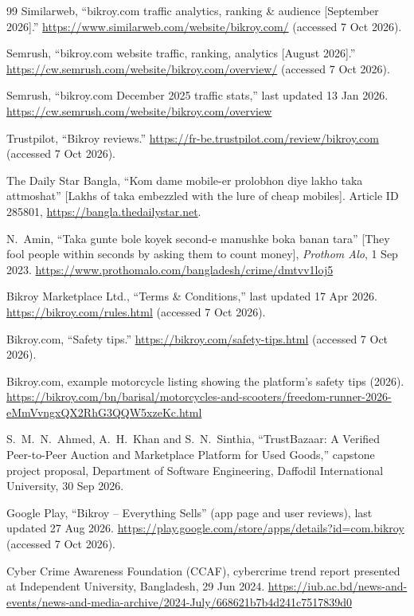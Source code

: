 \documentclass[11pt,a4paper]{article}
\begin{document}
\begin{thebibliography}{99}
 Similarweb, ``bikroy.com traffic analytics, ranking \& audience
[September 2026].'' \url{https://www.similarweb.com/website/bikroy.com/} (accessed 7 Oct 2026).

 Semrush, ``bikroy.com website traffic, ranking, analytics
[August 2026].'' \url{https://cw.semrush.com/website/bikroy.com/overview/} (accessed 7 Oct 2026).

 Semrush, ``bikroy.com December 2025 traffic stats,'' last updated
13 Jan 2026. \url{https://cw.semrush.com/website/bikroy.com/overview}

 Trustpilot, ``Bikroy reviews.''
\url{https://fr-be.trustpilot.com/review/bikroy.com} (accessed 7 Oct 2026).

 The Daily Star Bangla, ``Kom dame mobile-er prolobhon diye lakho
taka attmoshat'' [Lakhs of taka embezzled with the lure of cheap mobiles]. Article ID 285801,
\url{https://bangla.thedailystar.net}.

 N.~Amin, ``Taka gunte bole koyek second-e manushke boka banan tara''
[They fool people within seconds by asking them to count money], \emph{Prothom Alo},
1 Sep 2023. \url{https://www.prothomalo.com/bangladesh/crime/dmtvv1loj5}

 Bikroy Marketplace Ltd., ``Terms \& Conditions,'' last updated
17 Apr 2026. \url{https://bikroy.com/rules.html} (accessed 7 Oct 2026).

 Bikroy.com, ``Safety tips.''
\url{https://bikroy.com/safety-tips.html} (accessed 7 Oct 2026).

 Bikroy.com, example motorcycle listing showing the platform's
safety tips (2026).
\url{https://bikroy.com/bn/barisal/motorcycles-and-scooters/freedom-runner-2026-eMmVvngxQX2RhG3QQW5xzeKc.html}

 S.~M.~N.~Ahmed, A.~H.~Khan and S.~N.~Sinthia, ``TrustBazaar: A Verified
Peer-to-Peer Auction and Marketplace Platform for Used Goods,'' capstone project proposal,
Department of Software Engineering, Daffodil International University, 30 Sep 2026.

 Google Play, ``Bikroy -- Everything Sells'' (app page and user
reviews), last updated 27 Aug 2026.
\url{https://play.google.com/store/apps/details?id=com.bikroy} (accessed 7 Oct 2026).

 Cyber Crime Awareness Foundation (CCAF), cybercrime trend report
presented at Independent University, Bangladesh, 29 Jun 2024.
\url{https://iub.ac.bd/news-and-events/news-and-media-archive/2024-July/668621b7b4d241c7517839d0}


\end{thebibliography}
\end{document}
